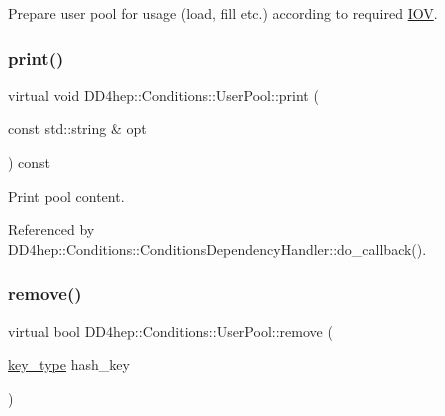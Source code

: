 Prepare user pool for usage (load, fill etc.) according to required \hyperlink{class_d_d4hep_1_1_i_o_v}{I\+OV}. 

\hypertarget{class_d_d4hep_1_1_conditions_1_1_user_pool_ab0496fbbd4a84368595d3bbd80c475e3}{}\label{class_d_d4hep_1_1_conditions_1_1_user_pool_ab0496fbbd4a84368595d3bbd80c475e3} 
\subsubsection{\texorpdfstring{print()}{print()}}
{\footnotesize\ttfamily virtual void D\+D4hep\+::\+Conditions\+::\+User\+Pool\+::print (\begin{DoxyParamCaption}\item[{const std\+::string \&}]{opt }\end{DoxyParamCaption}) const\hspace{0.3cm}{\ttfamily [pure virtual]}}



Print pool content. 



Referenced by D\+D4hep\+::\+Conditions\+::\+Conditions\+Dependency\+Handler\+::do\+\_\+callback().

\hypertarget{class_d_d4hep_1_1_conditions_1_1_user_pool_aeab574005dcfb99f8147b87d220f65f1}{}\label{class_d_d4hep_1_1_conditions_1_1_user_pool_aeab574005dcfb99f8147b87d220f65f1} 
\subsubsection{\texorpdfstring{remove()}{remove()}\hspace{0.1cm}{\footnotesize\ttfamily [1/2]}}
{\footnotesize\ttfamily virtual bool D\+D4hep\+::\+Conditions\+::\+User\+Pool\+::remove (\begin{DoxyParamCaption}\item[{\hyperlink{class_d_d4hep_1_1_conditions_1_1_user_pool_aa256cf1e22de1b9f2a84d39309b8bfa9}{key\+\_\+type}}]{hash\+\_\+key }\end{DoxyParamCaption})\hspace{0.3cm}{\ttfamily [pure virtual]}}



